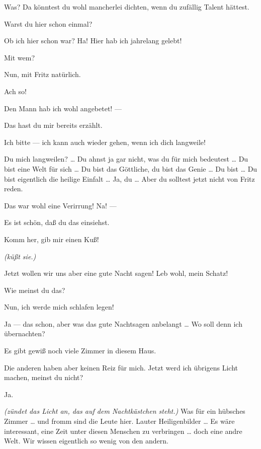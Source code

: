 \documentclass[
	final,
	a4paper,
	ngerman,
	mpinclude = true, %
	twoside = true,
	open = right,
	cleardoublepage = plain,
	DIV = 13,
	BCOR = 1cm,
	titlepage = firstiscover,
	]{scrbook}
\newcommand{\direction}[1]{\textit{(#1)}}
\newcommand{\thecharacter}[1]{\textup{\textsc{#1}}\xspace}
\newcommand{\thedichter}{\thecharacter{Dichter}}
\newcommand{\theschauspielerin}{\thecharacter{Schauspielerin}}
\newcommand{\character}[1]{\item[#1:]}
\newcommand{\dichter}{\character{\thedichter}}
\newcommand{\schauspielerin}{\character{\theschauspielerin}}
\begin{document}
\begin{play}
	\schauspielerin
	Was? Da könntest du wohl mancherlei dichten, wenn du zufällig Talent hättest.

	\dichter
	Warst du hier schon einmal?

	\schauspielerin
	Ob ich hier schon war? Ha! Hier hab ich jahrelang gelebt!

	\dichter
	Mit wem?

	\schauspielerin
	Nun, mit Fritz natürlich.

	\dichter
	Ach so!

	\schauspielerin
	Den Mann hab ich wohl angebetet! ---

	\dichter
	Das hast du mir bereits erzählt.

	\schauspielerin
	Ich bitte --- ich kann auch wieder gehen, wenn ich dich langweile!

	\dichter
	Du mich langweilen? \ldots{} Du ahnst ja gar nicht, was du für mich bedeutest \ldots{} Du bist eine Welt für sich \ldots{} Du bist das Göttliche, du bist das Genie \ldots{} Du bist \ldots{} Du bist eigentlich die heilige Einfalt \ldots{} Ja, du \ldots{} Aber du solltest jetzt nicht von Fritz reden.

	\schauspielerin
	Das war wohl eine Verirrung! Na! ---

	\dichter
	Es ist schön, daß du das einsiehst.

	\schauspielerin
	Komm her, gib mir einen Kuß!

	\dichter
	\direction{küßt sie.}

	\schauspielerin
	Jetzt wollen wir uns aber eine gute Nacht sagen! Leb wohl, mein Schatz!

	\dichter
	Wie meinst du das?

	\schauspielerin
	Nun, ich werde mich schlafen legen!

	\dichter
	Ja --- das schon, aber was das gute Nachtsagen anbelangt \ldots{} Wo soll denn ich übernachten?

	\schauspielerin
	Es gibt gewiß noch viele Zimmer in diesem Haus.

	\dichter
	Die anderen haben aber keinen Reiz für mich. Jetzt werd ich übrigens Licht machen, meinst du nicht?

	\schauspielerin
	Ja.

	\dichter
	\direction{zündet das Licht an, das auf dem Nachtkästchen steht.} Was für ein hübsches Zimmer \ldots{} und fromm sind die Leute hier. Lauter Heiligenbilder \ldots{} Es wäre interessant, eine Zeit unter diesen Menschen zu verbringen \ldots{} doch eine andre Welt. Wir wissen eigentlich so wenig von den andern.


\end{play}
\end{document}
